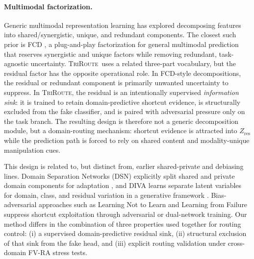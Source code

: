 \documentclass{article}
\newcommand{\method}{\textsc{TriRoute}}
\begin{document}
\paragraph{Multimodal factorization.}
Generic multimodal representation learning has explored decomposing features into shared/synergistic, unique, and redundant components. The closest such prior is FCD \citep{liu2025fcd}, a plug-and-play factorization for general multimodal prediction that reserves synergistic and unique factors while removing redundant, task-agnostic uncertainty. \method\ uses a related three-part vocabulary, but the residual factor has the opposite operational role. In FCD-style decompositions, the residual or redundant component is primarily unwanted uncertainty to suppress. In \method, the residual is an intentionally supervised \emph{information sink}: it is trained to retain domain-predictive shortcut evidence, is structurally excluded from the fake classifier, and is paired with adversarial pressure only on the task branch. The resulting design is therefore not a generic decomposition module, but a domain-routing mechanism: shortcut evidence is attracted into $Z_{\mathrm{res}}$ while the prediction path is forced to rely on shared content and modality-unique manipulation cues.

This design is related to, but distinct from, earlier shared-private and debiasing lines. Domain Separation Networks (DSN) explicitly split shared and private domain components for adaptation \citep{bousmalis2016dsn}, and DIVA learns separate latent variables for domain, class, and residual variation in a generative framework \citep{ilse2019diva}. Bias-adversarial approaches such as Learning Not to Learn \citep{kim2019learningnottolearn} and Learning from Failure \citep{nam2020learningfromfailure} suppress shortcut exploitation through adversarial or dual-network training. Our method differs in the combination of three properties used together for routing control: (i) a supervised domain-predictive residual sink, (ii) structural exclusion of that sink from the fake head, and (iii) explicit routing validation under cross-domain FV-RA stress tests.
\end{document}
